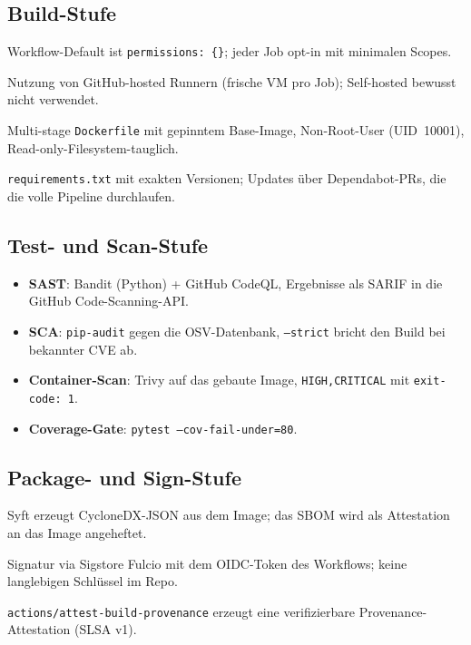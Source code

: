 \documentclass[12pt, a4paper]{scrartcl}
\begin{document}
\subsection{Build-Stufe}
\begin{description}[leftmargin=1.4em,style=nextline]
  \item[Least-Privilege-Permissions] Workflow-Default ist \texttt{permissions: \{\}};
        jeder Job opt-in mit minimalen Scopes.
  \item[Ephemere Runner] Nutzung von GitHub-hosted Runnern (frische VM pro Job);
        Self-hosted bewusst nicht verwendet.
  \item[Reproduzierbares Image] Multi-stage \texttt{Dockerfile} mit gepinntem
        Base-Image, Non-Root-User (UID~10001), Read-only-Filesystem-tauglich.
  \item[Dependency-Pinning] \texttt{requirements.txt} mit exakten Versionen;
        Updates über Dependabot-PRs, die die volle Pipeline durchlaufen.
\end{description}

\subsection{Test- und Scan-Stufe}
\begin{itemize}[leftmargin=1.4em]
  \item \textbf{SAST}: Bandit (Python) + GitHub CodeQL, Ergebnisse als SARIF in
        die GitHub Code-Scanning-API.
  \item \textbf{SCA}: \texttt{pip-audit} gegen die OSV-Datenbank, \texttt{--strict}
        bricht den Build bei bekannter CVE ab.
  \item \textbf{Container-Scan}: Trivy auf das gebaute Image,
        \texttt{HIGH,CRITICAL} mit \texttt{exit-code: 1}.
  \item \textbf{Coverage-Gate}: \texttt{pytest --cov-fail-under=80}.
\end{itemize}

\subsection{Package- und Sign-Stufe}
\begin{description}[leftmargin=1.4em,style=nextline]
  \item[SBOM] Syft erzeugt CycloneDX-JSON aus dem Image; das SBOM wird als
        Attestation an das Image angeheftet.
  \item[Cosign Keyless Signing] Signatur via Sigstore Fulcio mit dem
        OIDC-Token des Workflows; keine langlebigen Schlüssel im Repo.
  \item[SLSA-Provenance] \texttt{actions/attest-build-provenance} erzeugt eine
        verifizierbare Provenance-Attestation (SLSA v1).
\end{description}
\end{document}
